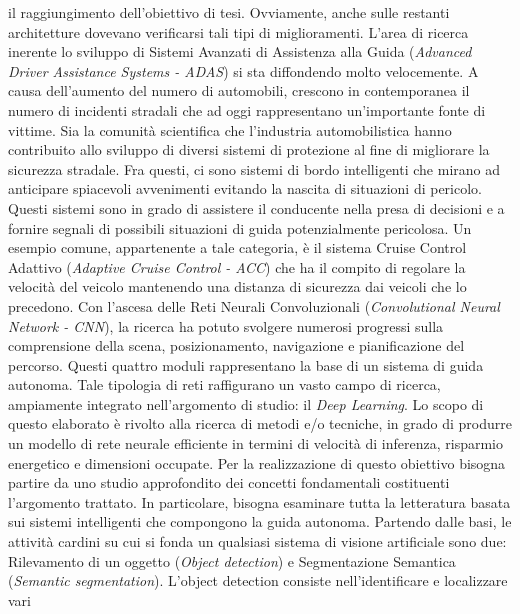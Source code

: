 il raggiungimento dell'obiettivo di tesi. Ovviamente, anche sulle restanti 
architetture dovevano verificarsi tali tipi di miglioramenti. L'area di ricerca inerente lo sviluppo di Sistemi Avanzati di Assistenza 
alla Guida (\emph{Advanced Driver Assistance Systems - ADAS}) si sta diffondendo molto velocemente. 
A causa dell'aumento del numero di automobili, crescono in contemporanea 
il numero di incidenti stradali che ad oggi rappresentano un'importante fonte 
di vittime. Sia la comunità scientifica che l'industria automobilistica hanno 
contribuito allo sviluppo di diversi sistemi di protezione al fine di migliorare 
la sicurezza stradale.  Fra questi, ci sono sistemi di bordo intelligenti che 
mirano ad anticipare spiacevoli avvenimenti evitando la nascita di situazioni 
di pericolo. Questi sistemi sono in grado di assistere il conducente nella presa 
di decisioni e a fornire segnali di possibili situazioni di guida potenzialmente 
pericolosa. Un esempio comune, appartenente a tale categoria, è il sistema 
Cruise Control Adattivo (\emph{Adaptive Cruise Control - ACC}) che ha il compito 
di regolare la velocità del veicolo mantenendo una distanza di sicurezza 
dai veicoli che lo precedono. Con l'ascesa delle Reti Neurali Convoluzionali (\emph{Convolutional Neural Network - CNN}), la ricerca ha potuto svolgere numerosi 
progressi sulla comprensione della scena, posizionamento, navigazione e 
pianificazione del percorso. Questi quattro moduli rappresentano la base di 
un sistema di guida autonoma. Tale tipologia di reti raffigurano un vasto 
campo di ricerca, ampiamente integrato nell'argomento di studio: il \emph{Deep 
Learning}. Lo scopo di questo elaborato è rivolto alla ricerca di metodi e/o 
tecniche, in grado di produrre un modello di rete neurale efficiente in termini 
di velocità di inferenza, risparmio energetico e dimensioni occupate. Per la 
realizzazione di questo obiettivo bisogna partire da uno studio approfondito 
dei concetti fondamentali costituenti l'argomento trattato. In particolare, 
bisogna esaminare tutta la letteratura basata sui sistemi intelligenti che 
compongono la guida autonoma. Partendo dalle basi, le attività cardini su 
cui si fonda un qualsiasi sistema di visione artificiale sono due: Rilevamento 
di un oggetto (\emph{Object detection}) e Segmentazione Semantica (\emph{Semantic 
segmentation}). L'object detection consiste nell'identificare e localizzare vari 
